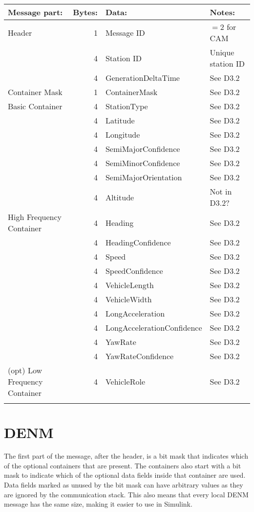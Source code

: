 \documentclass[11pt]{article}
\begin{document}
\begin{center}
\begin{tabular}{lrll}
Message part: & Bytes: & Data: & Notes:\\
\hline
Header & 1 & Message ID & \(=2\) for CAM\\
 & 4 & Station ID & Unique station ID\\
 & 4 & GenerationDeltaTime & See D3.2\\
\hline
Container Mask & 1 & ContainerMask & See D3.2\\
\hline
Basic Container & 4 & StationType & See D3.2\\
 & 4 & Latitude & See D3.2\\
 & 4 & Longitude & See D3.2\\
 & 4 & SemiMajorConfidence & See D3.2\\
 & 4 & SemiMinorConfidence & See D3.2\\
 & 4 & SemiMajorOrientation & See D3.2\\
 & 4 & Altitude & Not in D3.2?\\
\hline
High Frequency Container & 4 & Heading & See D3.2\\
 & 4 & HeadingConfidence & See D3.2\\
 & 4 & Speed & See D3.2\\
 & 4 & SpeedConfidence & See D3.2\\
 & 4 & VehicleLength & See D3.2\\
 & 4 & VehicleWidth & See D3.2\\
 & 4 & LongAcceleration & See D3.2\\
 & 4 & LongAccelerationConfidence & See D3.2\\
 & 4 & YawRate & See D3.2\\
 & 4 & YawRateConfidence & See D3.2\\
\hline
(opt) Low Frequency Container & 4 & VehicleRole & See D3.2\\
 &  &  & \\
\end{tabular}
\end{center}


\newpage
\section{DENM}
\label{sec:orgheadline3}
The first part of the message, after the header, is a bit mask that
indicates which of the optional containers that are present. The
containers also start with a bit mask to indicate which of the
optional data fields inside that container are used. Data fields
marked as unused by the bit mask can have arbitrary values as they are
ignored by the communication stack. This also means that every local
DENM message has the same size, making it easier to use in Simulink.
\end{document}
